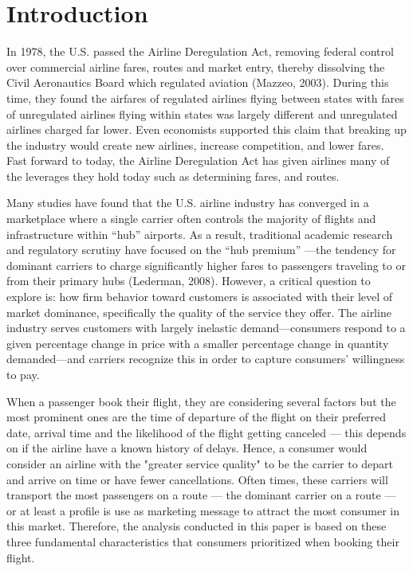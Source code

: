 \documentclass[preprint,12pt,authoryear]{elsarticle}
\begin{document}
\doublespacing 

\section{Introduction}
\label{sec:intro}
In 1978, the U.S. passed the Airline Deregulation Act, removing federal control over commercial airline fares, routes and market entry, thereby dissolving the Civil Aeronautics Board which regulated aviation (Mazzeo, 2003). During this time, they found the airfares of regulated airlines flying between states with fares of unregulated airlines flying within states was largely different and unregulated airlines charged far lower. Even economists supported this claim that breaking up the industry would create new airlines, increase competition, and lower fares. Fast forward to today, the Airline Deregulation Act has given airlines many of the leverages they hold today such as determining fares, and routes. 

Many studies have found that the U.S. airline industry has converged in a marketplace where a single carrier often controls the majority of flights and infrastructure within “hub” airports. As a result, traditional academic research and regulatory scrutiny have focused on the “hub premium” —the tendency for dominant carriers to charge significantly higher fares to passengers traveling to or from their primary hubs (Lederman, 2008). However, a critical question to explore is: how firm behavior toward customers is associated with their level of market dominance, specifically the quality of the service they offer. The airline industry serves customers with largely inelastic demand—consumers respond to a given percentage change in price with a smaller percentage change in quantity demanded—and carriers recognize this in order to capture consumers’ willingness to pay.

When a passenger book their flight, they are considering several factors but the most prominent ones are the time of departure of the flight on their preferred date, arrival time and the likelihood of the flight getting canceled --- this depends on if the airline have a known history of delays. Hence, a consumer would consider an airline with the "greater service quality" to be the carrier to depart and arrive on time or have fewer cancellations. Often times, these carriers will transport the most passengers on a route --- the dominant carrier on a route --- or at least a profile is use as marketing message to attract the most consumer in this market. Therefore, the analysis conducted in this paper is based on these three fundamental characteristics that consumers prioritized when booking their flight.
	
\end{document}
